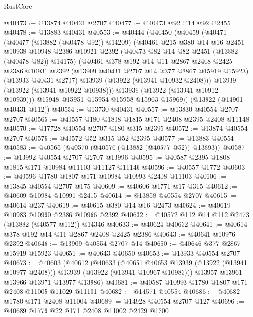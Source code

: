 \begin{lexlean}{RustCore}
\begin{coremodule}
@40473 := @13874 @40431 @2707
@40477 := @40473 @92 @14 @92 @2455
@40478 := @13883 @40431
@40553 := @40444
    (@40450
      (@40459
        (@40471
          (@40477 (@13882 (@40478 @92)) @14209)
          (@40461
            @215
            @380
            @14
            @16
            @2451
            @10938
            @10948
            @2386
            @10921
            @2392
            (@40473 @82 @14 @82 @2451 (@13882 (@40478 @82)) @14175)
            (@40461
              @378
              @192
              @14
              @11
              @2867
              @2408
              @2425
              @2386
              @10931
              @2392
              (@13909 @40431 @2707 @14 @377 @2867 @15919 @15923)
              (@13933 @40431 @2707)
              @13939
              (@13922 (@13941 @10932 @2408)))
            @13939
            (@13922 (@13941 @10922 @10938)))
          @13939
          (@13922 (@13941 @10912 @10939)))
        @15948
        @15951
        @15954
        @15958
        @15963
        @15969))
    (@13922 (@14901 @40431 @112))
@40554 := @13730 @40431
@40557 := @13830 @40554 @2707 @2707
@40565 := @40557 @180 @1808 @1815 @171 @2408 @2395 @2408 @11148
@40570 := @17728 @40554 @2707 @180 @315 @2395
@40572 := @13874 @40554 @2707
@40576 := @40572 @52 @315 @52 @2395
@40577 := @13883 @40554
@40583 := @40565 (@40570 (@40576 (@13882 (@40577 @52)) @13893))
@40587 := @13992 @40554 @2707 @2707 @13996
@40595 := @40587 @2395 @1808 @1815 @171 @10984 @11103 @11127 @11146
@40596 := @40557 @1772
@40603 := @40596 @1780 @1807 @171 @10984 @10993 @2408 @11103
@40606 := @13845 @40554 @2707 @175
@40609 := @40606 @1771 @17 @315
@40612 := @40609 @10984 @10991 @2415
@40614 := @13858 @40554 @2707
@40615 := @40614 @237
@40619 := @40615 @380 @14 @16 @2473
@40624 := @40619 @10983 @10990 @2386 @10966 @2392
@40632 := @40572 @112 @14 @112 @2473 (@13882 (@40577 @112)) @14346
@40633 := @40624 @40632
@40641 := @40614 @378 @192 @14 @11 @2867 @2408 @2425 @2386
@40643 := @40641 @10976 @2392
@40646 := @13909 @40554 @2707 @14
@40650 := @40646 @377 @2867 @15919 @15923
@40651 := @40643 @40650
@40653 := @13933 @40554 @2707
@40673 := @40603
    (@40612
      (@40633
        (@40651 @40653 @13939 (@13922 (@13941 @10977 @2408)))
        @13939
        (@13922 (@13941 @10967 @10983)))
      @13957
      @13961
      @13966
      @13971
      @13977
      @13986)
@40681 := @40587 @10993 @1780 @1807 @171 @2408 @11005 @11029 @11101
@40682 := @14571 @40554
@40686 := @40682 @1780 @171 @2408 @11004
@40689 := @14928 @40554 @2707 @127
@40696 := @40689 @1779 @22 @171 @2408 @11002 @2429 @1300

\end{coremodule}
\end{lexlean}
